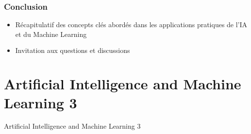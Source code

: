 \documentclass{beamer}
\begin{document}
\begin{frame}
	\frametitle{Conclusion}
	\begin{itemize}
		\item Récapitulatif des concepts clés abordés dans les applications pratiques de l'IA et du Machine Learning
		\item Invitation aux questions et discussions
	\end{itemize}
\end{frame}

\section{Artificial Intelligence and Machine Learning 3}

{
\begin{frame}{Artificial Intelligence and Machine Learning 3}
\end{frame}

}
\end{document}
